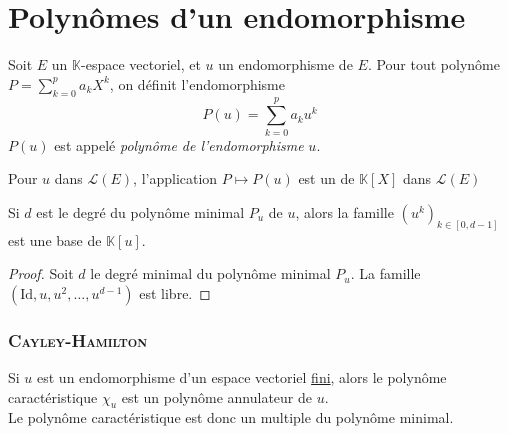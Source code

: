 \documentclass[11pt,a4paper,fleqn,pdftex]{report}
\begin{document}
\section{Polynômes d'un endomorphisme} %
\label{sec:polyn_mes_d_un_endomorphisme}
\begin{dfn}
     Soit $E$ un $\mathbb{K}$-espace vectoriel, et $u$ un endomorphisme de $E$. \newline
     Pour tout polynôme $P = \sum_{k=0}^p a_k X^k$, on définit l'endomorphisme 
     \begin{equation}
     P(u) = \sum_{k=0}^p a_k u^k
     \end{equation}
     $P(u)$ est appelé \emph{polynôme de l'endomorphisme} $u$.
\end{dfn}
\needspace{3cm}
\begin{theorem}
     Pour $u$ dans $\mathcal{L}(E)$, l'application $P \mapsto P(u)$ est un  de $\mathbb{K} [X]$ dans $\mathcal{L}(E)$
\end{theorem}
\begin{theorem}%
     Si $d$ est le degré du polynôme minimal $P_u$ de $u$, alors la famille $(u^k)_{k \in \left[ 0 , d-1 \right] }$ est une base de $\mathbb{K} [u]$.
\end{theorem}
\begin{proof}
     Soit $d$ le degré minimal du polynôme minimal $P_u$. La famille $(\mathrm{Id}, u, u^2, \ldots , u^{d-1} )$ est libre. 
\end{proof}
\subsubsection{\textsc{Cayley}-\textsc{Hamilton}} %
\label{ssub:Cayley-Hamilton}
\begin{itheorem}
Si $u$ est un endomorphisme d'un espace vectoriel \uline{fini}, alors le polynôme caractéristique $\chi_u$ est un polynôme annulateur de $u$. \\
Le polynôme caractéristique est donc un multiple du polynôme minimal. 
\end{itheorem}
\end{document}
